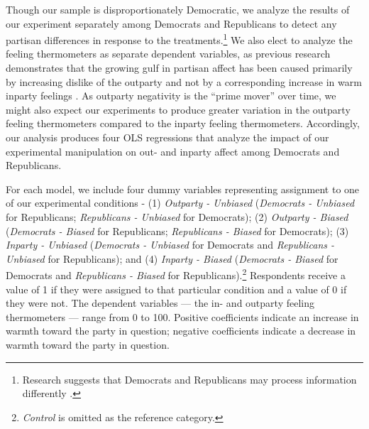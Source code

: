 \documentclass[12pt, letterpaper]{article}
\begin{document}
Though our sample is disproportionately Democratic, we analyze the results of our experiment separately among Democrats and Republicans to detect any partisan differences in response to the treatments.\footnote{Research suggests that Democrats and Republicans may process information differently \citep{grossmanhopkins_2016}.} We also elect to analyze the feeling thermometers as separate dependent variables, as previous research demonstrates that the growing gulf in partisan affect has been caused primarily by increasing dislike of the outparty and not by a corresponding increase in warm inparty feelings \citep{haidthetherington_2012, IyengarSoodLelkes2012}. As outparty negativity is the ``prime mover'' over time, we might also expect our experiments to produce greater variation in the outparty feeling thermometers compared to the inparty feeling thermometers. Accordingly, our analysis produces four OLS regressions that analyze the impact of our experimental manipulation on out- and inparty affect among Democrats and Republicans. 

For each model, we include four dummy variables representing assignment to one of our experimental conditions - (1) \textit{Outparty - Unbiased} (\textit{Democrats - Unbiased} for Republicans; \textit{Republicans - Unbiased} for Democrats); (2) \textit{Outparty - Biased} (\textit{Democrats - Biased} for Republicans; \textit{Republicans - Biased} for Democrats); (3) \textit{Inparty - Unbiased} (\textit{Democrats - Unbiased} for Democrats and \textit{Republicans - Unbiased} for Republicans); and (4) \textit{Inparty - Biased} (\textit{Democrats - Biased} for Democrats and \textit{Republicans - Biased} for Republicans).\footnote{\textit{Control} is omitted as the reference category.} Respondents receive a value of 1 if they were assigned to that particular condition and a value of 0 if they were not. The dependent variables --- the in- and outparty feeling thermometers --- range from 0 to 100. Positive coefficients indicate an increase in warmth toward the party in question; negative coefficients indicate a decrease in warmth toward the party in question.
\end{document}

